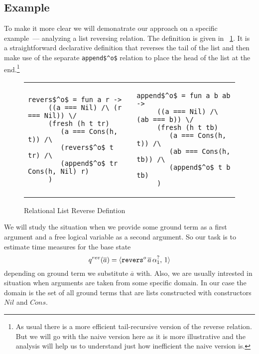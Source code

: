  
 
 
 
\subsection{Example}

To make it more clear we will demonatrate our approach on a specific example~--- analyzing a list reversing relation. The definition is given in \figureword~\ref{fig:reverso_definition}. It is a straightforward declarative definition that reverses the tail of the list and then make use of the separate \lstinline|append$^o$| relation to place the head of the list at the end.\footnote{As usual there is a more efficient tail-recursive version of the reverse relation. But we will go with the naive version here as it is more illustrative and the analysis will help us to understand just how inefficient the naive version is.}

\begin{figure}[t]
\begin{tabular}{p{6cm}p{6cm}}
\begin{lstlisting}[basicstyle=\small]
   revers$^o$ = fun a r ->
     ((a === Nil) /\ (r === Nil)) \/
     (fresh (h t tr)
        (a === Cons(h, t)) /\
        (revers$^o$ t tr) /\
        (append$^o$ tr Cons(h, Nil) r)
     )
\end{lstlisting} &
\begin{lstlisting}[basicstyle=\small]
   append$^o$ = fun a b ab ->
     ((a === Nil) /\ (ab === b)) \/
     (fresh (h t tb)
        (a === Cons(h, t)) /\
        (ab === Cons(h, tb)) /\
        (append$^o$ t b tb)
     )
\end{lstlisting}
\end{tabular}

\caption{Relational List Reverse Defintion}
\label{fig:reverso_definition}
\end{figure}

We will study the situation when we provide some ground term as a first argument and a free logical variable as a second argument. So our task is to estimate time measures for the base state \[ q^{rev}(\overline{a}) = \langle \texttt{revers$^o$} \, \overline{a} \, \alpha_1^?  ,\, 1 \rangle \] depending on ground term we substitute $\overline{a}$ with. Also, we are usually intrested in situation when arguments are taken from some specific domain. In our case the domain is the set of all ground terms that are lists constructed with constructors $Nil$ and $Cons$.

